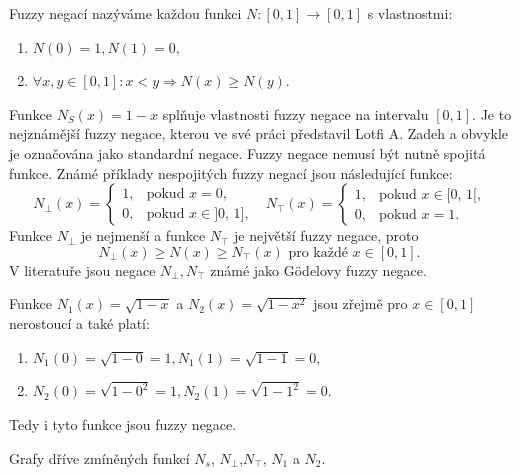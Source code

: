\begin{definition}
\cite{Kolo} Fuzzy negací nazýváme každou funkci $N:[0, 1] \to [0, 1]$  s vlastnostmi:
    \begin{enumerate}
        \item  $N(0) = 1, N(1) = 0,$
        \item $\forall  x, y \in [0, 1]: x < y \Rightarrow{} N(x) \geq N(y).$
     \end{enumerate}
\end{definition}
     \begin{example}
         Funkce $N_S(x)=1-x$ spl\v nuje vlastnosti fuzzy negace na intervalu $[0,1].$ Je to nejzn\'am\v ej\v s\'i fuzzy negace, kterou ve sv\'e pr\'aci p\v redstavil Lotfi A. Zadeh a obvykle je ozna\v cov\'ana jako standardn\'i negace.   Fuzzy negace nemus\'i b\'yt nutn\v e spojit\'a funkce. Zn\'am\'e p\v r\'iklady nespojit\'ych fuzzy negac\'i jsou n\'asleduj\'ic\'i funkce:
         $$ N_{\bot}(x)=\begin{cases} 1, & \mbox{pokud }x=0, \\
         0, & \mbox{pokud }x\in \mbox{]0, 1]}, \end{cases} \mbox{  }
         N_{\top}(x)=\begin{cases} 1, & \mbox{pokud }x\in \mbox{[0, 1[}, \\
         0, & \mbox{pokud }x=1. \end{cases}$$
         Funkce $N_{\bot}$ je nejmen\v s\'i a funkce $N_{\top}$ je nejv\v et\v s\'i fuzzy negace, proto
         \begin{equation}
        N_{\bot}(x) \geq N(x) \geq N_\top(x)  \mbox{ pro každé } x \in [0, 1]. \
    \end{equation}
    V literatu\v re jsou negace $N_\bot, N_\top$ zn\'am\'e jako Gödelovy fuzzy negace.
    
    Funkce $N_1(x) = \sqrt{1-x}$ a $N_2(x) = \sqrt{1-x^2}$ jsou zřejmě pro $ x \in [0,1]$ nerostoucí a tak\'e plat\'i:
        \begin{enumerate}
            \item $N_1(0) = \sqrt{1-0} = 1, 
                    N_1(1) = \sqrt{1-1} = 0, $
            \item $N_2(0) = \sqrt{1-0^2} = 1,
                    N_2(1) = \sqrt{1-1^2} = 0.$
        \end{enumerate}
         Tedy i tyto funkce jsou fuzzy negace.

         \begin{graph} Grafy dříve zmíněných funkcí $N_s$, $N_{\bot}$,$ N_{\top}$, $N_1$ a $N_2.$\\
         

\end{graph}
\end{example}
